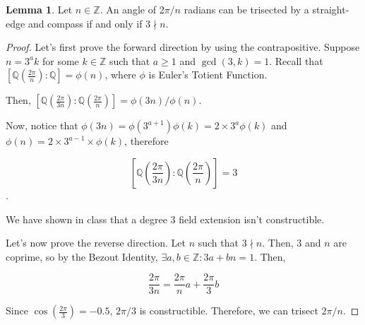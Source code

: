 \documentclass{article}
\theoremstyle{definition}
\newtheorem{lemma}[theorem]{Lemma}
\newcommand{\Z}{\mathbb{Z}}
\newcommand{\Q}{\mathbb{Q}}
\begin{document}
\begin{lemma}
    Let $n \in \Z$. An angle of $2 \pi / n$ radians can be trisected by a straight-edge and compass
    if and only if $3 \nmid n$.
\end{lemma}
\begin{proof}
    Let's first prove the forward direction by using the contrapositive.
    Suppose $n = 3^{a}k$ for some $k \in \Z$ such that $a \geq 1$
    and $\gcd(3,k) = 1$.
    Recall that $[\Q(\frac{2\pi}{n}) : \Q] = \phi(n)$, where $\phi$
    is Euler's Totient Function.

    Then, $[\Q(\frac{2\pi}{3n}) : \Q(\frac{2\pi}{n})] = \phi(3n) / \phi(n)$.

    Now, notice that $\phi(3n) = \phi(3^{a+1}) \phi(k) = 2 \times 3^{a} \phi(k)$
    and $\phi(n) = 2 \times  3^{a-1} \times \phi(k)$, therefore 

    \[ [\Q(\frac{2\pi}{3n}) : \Q(\frac{2\pi}{n})] = 3\].

    We have shown in class that a degree 3 field extension isn't constructible.
  
    Let's now prove the reverse direction. Let $n$ such that $3 \nmid n$.
    Then, $3$ and $n$ are coprime, so by the Bezout Identity, $\exists a,b \in \Z:
    3a + bn = 1$. Then,

    \[ \frac{2\pi}{3n} = \frac{2\pi}{n} a + \frac{2\pi}{3}b\]

    Since $\cos(\frac{2\pi}{3}) = -0.5$, $2\pi/3$ is constructible. Therefore,
    we can trisect $2\pi/n$.    
\end{proof}
\end{document}
